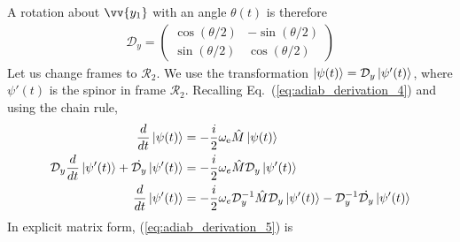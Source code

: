 %
A rotation about $\vv{y_1}$ with an angle $\theta(t)$ is therefore
%
\begin{align}
    \mathcal{{D}}_{y}=\left(\begin{matrix}
    \cos\left(\theta / 2\right) & -\sin\left(\theta / 2\right)\\
    \sin\left(\theta / 2\right) & \cos\left(\theta / 2\right)
    \end{matrix}\right)
\end{align}
%
Let us change frames to $\mathcal{R}_2$. We use the transformation $\Ket{\psi(t)}=\mathcal{{D}}_{y}\Ket{\psi'(t)}$, where $\psi'(t)$ is the spinor in frame $\mathcal{R}_2$. Recalling Eq.~(\ref{eq:adiab_derivation_4}) and using the chain rule,
%
\begin{align}
    \frac{d}{dt}\Ket{\psi(t)} &= -\frac{i}{2}\omega_\text{e}\hat{M}\Ket{\psi(t)} \nonumber \\
    \mathcal{{D}}_{y}\frac{d}{dt}\Ket{\psi'(t)}+\dot{\mathcal{{D}}_{y}}\Ket{\psi'(t)}&=-\frac{i}{2}\omega_{e}\hat{M}\mathcal{{D}}_{y}\Ket{\psi'(t)} \nonumber \\
    \frac{d}{dt}\Ket{\psi'(t)}&=-\frac{i}{2}\omega_{e}\mathcal{{D}}_{y}^{-1}\hat{M}\mathcal{{D}}_{y}\Ket{\psi'(t)}-\mathcal{{D}}_{y}^{-1}\dot{\mathcal{{D}}_{y}}\Ket{\psi'(t)}
    \label{eq:adiab_derivation_5}
\end{align}
%
In explicit matrix form, (\ref{eq:adiab_derivation_5}) is
